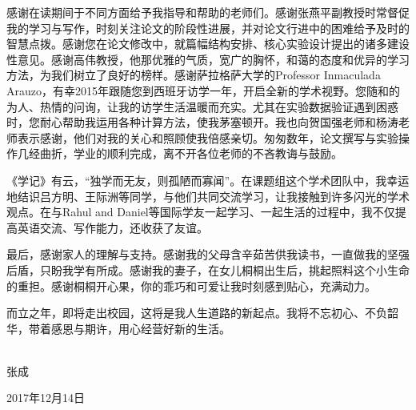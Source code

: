 \begin{ack}
感谢在读期间于不同方面给予我指导和帮助的老师们。感谢张燕平副教授时常督促我的学习与写作，时刻关注论文的阶段性进展，并对论文行进中的困难给予及时的智慧点拨。感谢您在论文修改中，就篇幅结构安排、核心实验设计提出的诸多建设性意见。感谢高伟教授，他那优雅的气质，宽广的胸怀，和蔼的态度和优异的学习方法，为我们树立了良好的榜样。感谢萨拉格萨大学的Professor Inmaculada Arauzo，有幸2015年跟随您到西班牙访学一年，开启全新的学术视野。您随和的为人、热情的问询，让我的访学生活温暖而充实。尤其在实验数据验证遇到困惑时，您耐心帮助我运用各种计算方法，使我茅塞顿开。我也向贺国强老师和杨涛老师表示感谢，他们对我的关心和照顾使我倍感亲切。匆匆数年，论文撰写与实验操作几经曲折，学业的顺利完成，离不开各位老师的不吝教诲与鼓励。

《学记》有云，“独学而无友，则孤陋而寡闻”。在课题组这个学术团队中，我幸运地结识吕方明、王际洲等同学，与他们共同交流学习，让我接触到许多闪光的学术观点。在与Rahul and Daniel等国际学友一起学习、一起生活的过程中，我不仅提高英语交流、写作能力，还收获了友谊。

最后，感谢家人的理解与支持。感谢我的父母含辛茹苦供我读书，一直做我的坚强后盾，只盼我学有所成。感谢我的妻子，在女儿桐桐出生后，挑起照料这个小生命的重担。感谢桐桐开心果，你的乖巧和可爱让我时刻感到贴心，充满动力。

而立之年，即将走出校园，这将是我人生道路的新起点。我将不忘初心、不负韶华，带着感恩与期许，用心经营好新的生活。
\\
\\
\begin{flushright}
	张成
	
	2017年12月14日
\end{flushright}


\end{ack}
